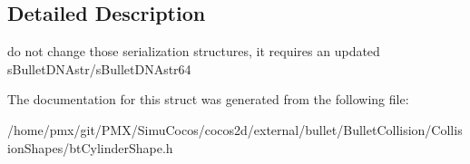 \subsection{Detailed Description}
do not change those serialization structures, it requires an updated s\+Bullet\+D\+N\+Astr/s\+Bullet\+D\+N\+Astr64 

The documentation for this struct was generated from the following file\+:\begin{DoxyCompactItemize}
\item 
/home/pmx/git/\+P\+M\+X/\+Simu\+Cocos/cocos2d/external/bullet/\+Bullet\+Collision/\+Collision\+Shapes/bt\+Cylinder\+Shape.\+h\end{DoxyCompactItemize}
